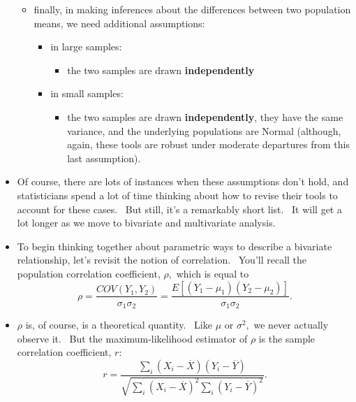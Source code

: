 \documentclass[11pt]{article}
\begin{document}
\begin{itemize}
\begin{itemize}
\item finally, in making inferences about the differences between two
population means, we need additional assumptions:

\begin{itemize}
\item in large samples:

\begin{itemize}
\item the two samples are drawn \textbf{independently}
\end{itemize}

\item in small samples:

\begin{itemize}
\item the two samples are drawn \textbf{independently}, they have the same
variance, and the underlying populations are Normal (although, again, these
tools are robust under moderate departures from this last assumption).
\end{itemize}
\end{itemize}
\end{itemize}

\item Of course, there are lots of instances when these assumptions don't
hold, and statisticians spend a lot of time thinking about how to revise
their tools to account for these cases. \ But still, it's a remarkably short
list. \ It will get a lot longer as we move to bivariate and multivariate
analysis.

\item To begin thinking together about parametric ways to describe a
bivariate relationship, let's revisit the notion of correlation. \ You'll
recall the population correlation coefficient, $\rho ,$ which is equal to%
\begin{equation*}
\rho =\frac{COV(Y_{1},Y_{2})}{\sigma _{1}\sigma _{2}}=\frac{E\left[
(Y_{1}-\mu _{1})(Y_{2}-\mu _{2})\right] }{\sigma _{1}\sigma _{2}}.
\end{equation*}

\item $\rho $ is, of course, is a theoretical quantity. \ Like $\mu $ or $%
\sigma ^{2},$ we never actually observe it. \ But the maximum-likelihood
estimator of $\rho $ is the sample correlation coefficient, $r:$%
\begin{equation*}
r=\frac{\sum\nolimits_{i}\left( X_{i}-\overline{X}\right) \left( Y_{i}-%
\overline{Y}\right) }{\sqrt{\sum\nolimits_{i}\left( X_{i}-\overline{X}%
\right) ^{2}\sum\nolimits_{i}\left( Y_{i}-\overline{Y}\right) ^{2}}}.
\end{equation*}


\end{itemize}
\end{document}
